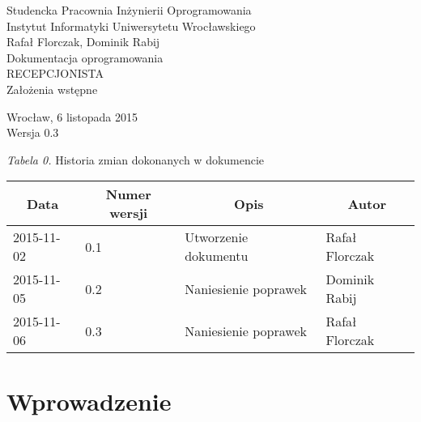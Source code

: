 \documentclass [11pt, a4paper, leqno] {article}
\begin{document}

\begin{center}
  \thispagestyle{empty} %
  {\large Studencka Pracownia Inżynierii Oprogramowania} \\ [0.5cm]
	{\large Instytut Informatyki Uniwersytetu Wrocławskiego} \\ [6.0cm]

  {\large Rafał Florczak, Dominik Rabij} \\ [1.5cm]

	{\huge Dokumentacja oprogramowania} \\ [0.5cm]
  {\huge RECEPCJONISTA} \\ [1.5cm]

  {\large Założenia wstępne} \\ [0.5cm]

  \vfill
  
  {\large Wrocław, 6 listopada 2015} \\ [0.5cm]
  {\large Wersja 0.3}
\end{center}

\newpage


\textit{Tabela 0.} Historia zmian dokonanych w dokumencie

\begin{center}
  \begin{tabular}{| l | l | l | l |}
    \hline
    \multicolumn{1}{|c|}{Data} & 
    \multicolumn{1}{|c|}{Numer wersji} &  
    \multicolumn{1}{|c|}{Opis} &
    \multicolumn{1}{|c|}{Autor} \\ \hline \hline
    2015-11-02 & 0.1 & Utworzenie dokumentu & Rafał Florczak \\ \hline
    2015-11-05 & 0.2 & Naniesienie poprawek & Dominik Rabij\\ \hline
    2015-11-06 & 0.3 & Naniesienie poprawek & Rafał Florczak\\ \hline
  \end{tabular}
\end{center}

\medskip

\tableofcontents

\newpage

\section{Wprowadzenie}
\end{document}
